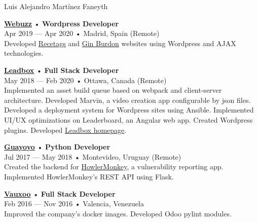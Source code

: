 \documentclass[12pt]{article}
\begin{document}
\begin{cv}{Luis Alejandro Mart\'inez Faneyth}
\begin{minipage}[t]{0.55\textwidth}
{    }\vspace{0.125em}
    \parbox[t]{\linewidth}{
      \textbf{\href{https://web.archive.org/web/20180413143616/https://webuzz.es/}{Webuzz}} • \textrm{\textbf{Wordpress Developer}}\\
      Apr 2019 --- Apr 2020 • Madrid, Spain (Remote)\\
      \footnotesize{Developed \href{https://web.archive.org/web/20201101021046/https://www.recetags.com/}{Recetags} and \href{https://web.archive.org/web/20191206145303/https://www.ginburdon.com/}{Gin Burdon} websites using Wordpress and AJAX technologies.}\\
    }\vspace{0.125em}
    \parbox[t]{\linewidth}{
      \textbf{\href{https://leadboxhq.com}{Leadbox}} • \textrm{\textbf{Full Stack Developer}}\\
      May 2018 --- Feb 2020 • Ottawa, Canada (Remote)\\
      \footnotesize{Implemented an asset build queue based on webpack and client-server architecture. Developed Marvin, a video creation app configurable by json files. Developed a deployment system for Wordpress sites using Ansible. Implemented UI/UX optimizations on Leaderboard, an Angular web app. Created Wordpress plugins. Developed \href{https://leadboxhq.com}{Leadbox homepage}.}\\
    }\vspace{0.125em}
    \parbox[t]{\linewidth}{
      \textbf{\href{https://guayoyo.io}{Guayoyo}} • \textrm{\textbf{Python Developer}}\\
      Jul 2017 --- May 2018 • Montevideo, Uruguay (Remote)\\
      \footnotesize{Created the backend for \href{https://howlermonkey.io}{HowlerMonkey}, a vulnerability reporting app. Implemented HowlerMonkey's REST API using Flask.}\\
    }\vspace{0.125em}
    \parbox[t]{\linewidth}{
      \textbf{\href{https://www.vauxoo.com}{Vauxoo}} • \textrm{\textbf{Full Stack Developer}}\\
      Feb 2016 --- Nov 2016 • Valencia, Venezuela\\
      \footnotesize{Improved the company's docker images. Developed Odoo pylint modules.}\\
    }\vspace{0.125em}

\end{minipage}
\end{cv}
\end{document}
